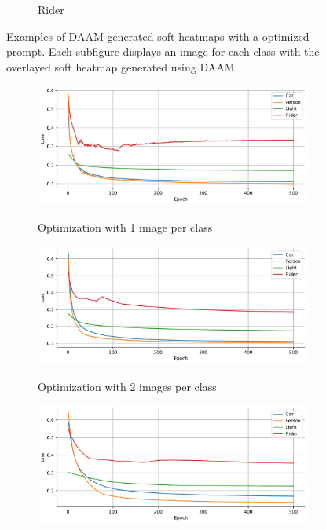 \begin{figure}
\begin{subfigure}{0.24\columnwidth}
   \caption{Rider}
   \label{subfig:dataset-example-rider-daam-optimized}
  \end{subfigure}
  \caption[Examples of DAAM-generated soft heatmaps optimized]{Examples of DAAM-generated soft heatmaps with a optimized prompt. Each subfigure displays an image for each class with the overlayed soft heatmap generated using DAAM.}
  \label{fig:dataset-examples-daam-optimized}
  \end{figure}


\begin{figure}
\centering
\begin{subfigure}{0.9\columnwidth}
    \centering
    \includegraphics[width=\columnwidth]{img/6-appendix/optimization-curve-1-images.pdf}
    \label{fig:apendix-loss-curves-1-image}
    \caption{Optimization with 1 image per class}
\end{subfigure}
\begin{subfigure}{0.9\columnwidth}
    \centering
    \includegraphics[width=\columnwidth]{img/6-appendix/optimization-curve-2-images.pdf}
    \label{fig:apendix-loss-curves-2-image}
    \caption{Optimization with 2 images per class}
\end{subfigure}
\begin{subfigure}{0.9\columnwidth}
    \centering
    \includegraphics[width=\columnwidth]{img/6-appendix/optimization-curve-5-images.pdf}

\end{subfigure}
\end{figure}
